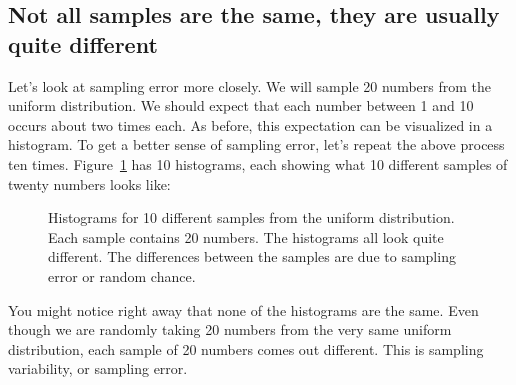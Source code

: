 \documentclass[
  letterpaper,
  DIV=11,
  numbers=noendperiod]{scrreprt}
\begin{document}
\subsection{Not all samples are the same, they are usually quite
different}\label{not-all-samples-are-the-same-they-are-usually-quite-different}

Let's look at sampling error more closely. We will sample 20 numbers
from the uniform distribution. We should expect that each number between
1 and 10 occurs about two times each. As before, this expectation can be
visualized in a histogram. To get a better sense of sampling error,
let's repeat the above process ten times. Figure~\ref{fig-5manysamples}
has 10 histograms, each showing what 10 different samples of twenty
numbers looks like:

\begin{figure}


\caption{\label{fig-5manysamples}Histograms for 10 different samples
from the uniform distribution. Each sample contains 20 numbers. The
histograms all look quite different. The differences between the samples
are due to sampling error or random chance.}

\end{figure}%

You might notice right away that none of the histograms are the same.
Even though we are randomly taking 20 numbers from the very same uniform
distribution, each sample of 20 numbers comes out different. This is
sampling variability, or sampling error.
\end{document}
